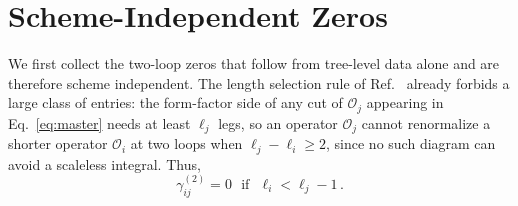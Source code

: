 \section{Scheme-Independent Zeros\label{sec:2loopSI}}

We first collect the two-loop zeros that follow from tree-level data alone and are therefore scheme independent. 
The length selection rule of Ref.~\cite{Bern:2019wie} already forbids a large class of entries: the form-factor side of any cut of $\mathcal O_j$ appearing in Eq.~\eqref{eq:master} needs at least $\ell_j$ legs, so an operator $\mathcal O_j$ cannot renormalize a shorter operator $\mathcal O_i$ at two loops when $\ell_j - \ell_i \ge 2$, since no such diagram can avoid a scaleless integral. Thus,
\begin{equation}
    \gamma^{(2)}_{ij} = 0 \ \ \ \text{if} \ \ \ \ell_i < \ell_j - 1\,.
\end{equation}

